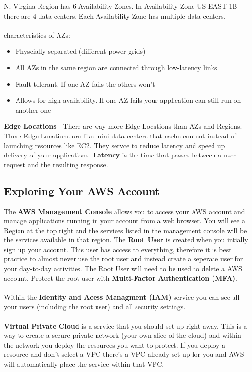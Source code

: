 \documentclass{article}%
\begin{document}
N. Virgina Region has 6 Availability Zones. In Availability Zone US-EAST-1B there are 4 data centers. Each Availability Zone has multiple data centers. \\ \\
characteristics of AZs:
\begin{itemize}
    \item Physcially separated (different power grids)
    \item All AZs in the same region are connected through low-latency links 
    \item Fault tolerant. If one AZ fails the others won't
    \item Allows for high availability. If one AZ fails your application can still run on another one
\end{itemize}

\textbf{Edge Locations} - There are way more Edge Locations than AZs and Regions. These Edge Locations are like mini data centers that cache content instead of launching resources like EC2. They servce to reduce latency and speed up delivery of your applications. \textbf{Latency} is the time that 
passes between a user request and the resulting response.  

\subsection{Exploring Your AWS Account}
The \textbf{AWS Management Console} allows you to access your AWS account and manage applications running in your account from a web browser. You will see a Region at the top right and the services listed in the management console will be the services available in that region. The \textbf{Root User} is created when you intially sign up your account. This user has access to everything, therefore it is best practice to almost never use the root user and instead create a 
seperate user for your day-to-day activities. The Root User will need to be used to delete a AWS account. Protect the root user with \textbf{Multi-Factor Authentication (MFA)}. \\ \\

Within the \textbf{Identity and Acess Managment (IAM)} service you can see all your users (including the root user) and all security settings. \\ \\ 

\textbf{Virtual Private Cloud} is a service that you should set up right away. This is a way to create a secure private network (your own slice of the cloud) and within the network you deploy the resources you want to protect. If you deploy a resource and don't select a VPC there's a VPC already set up for you and AWS will automatically place the service within that VPC. \\ \\ 
\end{document}
